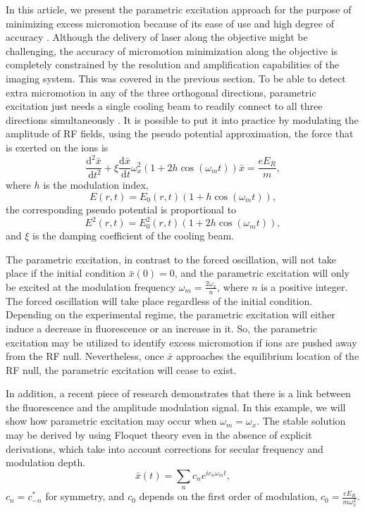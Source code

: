 In this article, we present the parametric excitation approach for the purpose of minimizing excess micromotion because of its ease of use and high degree of accuracy \cite{RN101,RN130,RN200,RN122,RN112}. Although the delivery of laser along the objective might be challenging, the accuracy of micromotion minimization along the objective is completely constrained by the resolution and amplification capabilities of the imaging system. This was covered in the previous section. To be able to detect extra micromotion in any of the three orthogonal directions, parametric excitation just needs a single cooling beam to readily connect to all three directions simultaneously \cite{RN79,RN123,RN111,RN113}. It is possible to put it into practice by modulating the amplitude of RF fields, using the pseudo potential approximation, the force that is exerted on the ions is
\begin{equation}\label{eq:parametric_excitation}
    \frac{\mathrm{d}^2 \bar{x}}{\mathrm{~d} t^2}+\xi \frac{\mathrm{d} \bar{x}}{\mathrm{~d} t} \omega_x^2\left(1+2 h \cos \left(\omega_m t\right)\right) \bar{x}=\frac{e E_R}{m},
\end{equation}
where \(h\) is the modulation index,
\begin{equation}
    E(r,t)=E_0(r,t)(1+h\cos(\omega_m t)),
\end{equation}
the corresponding pseudo potential is proportional to
\begin{equation}
    E^2(r,t)=E_0^2(r,t)(1+2h\cos(\omega_m t)),
\end{equation}
and \(\xi\) is the damping coefficient of the cooling beam.

The parametric excitation, in contrast to the forced oscillation, will not take place if the initial condition \(\bar{x}(0)=0\), and the parametric excitation will only be excited at the modulation frequency \(\omega_m=\frac{2\omega_x}{n}\), where \(n\) is a positive integer. The forced oscillation will take place regardless of the initial condition. Depending on the experimental regime, the parametric excitation will either induce a decrease in fluorescence or an increase in it. So, the parametric excitation may be utilized to identify excess micromotion if ions are pushed away from the RF null. Nevertheless, once \(\bar{x}\) approaches the equilibrium location of the RF null, the parametric excitation will cease to exist.

In addition, a recent piece of research demonstrates that there is a link between the fluorescence and the amplitude modulation signal. In this example, we will show how parametric excitation may occur when \(\omega_m=\omega_x\). The stable solution may be derived by using Floquet theory even in the absence of explicit derivations, which take into account corrections for secular frequency and modulation depth.
\begin{equation}
    \bar{x}(t)=\sum_nc_ne^{ic_n\omega_mt},
\end{equation}
\(c_n=c_{-n}^*\) for symmetry, and \(c_0\) depends on the first order of modulation, \(c_0=\frac{eE_R}{m\omega_x^2}\).

